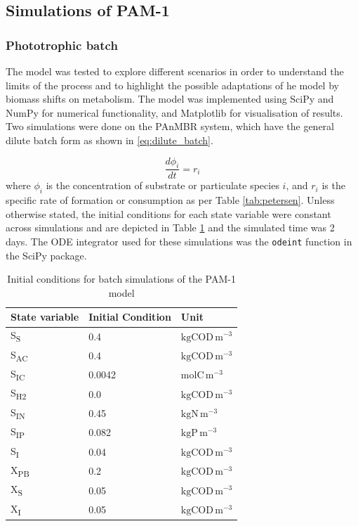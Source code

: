 \subsection{Simulations of PAM-1}

\subsubsection{Phototrophic batch}
The model was tested to explore different scenarios in order to understand the limits of the process and to highlight the possible adaptations of he model by biomass shifts on metabolism. 
The model was implemented using SciPy \cite{jones2001} and NumPy \cite{walt2011} for numerical functionality, and Matplotlib \cite{hunter2007} for visualisation of results. 
Two simulations were done on the PAnMBR system, which have the general dilute batch form as shown in \eqref{eq:dilute_batch}.

\begin{equation}
    \frac{d\phi_i}{dt} = r_i
    \label{eq:dilute_batch}
\end{equation}
where $\phi_i$ is the concentration of substrate or particulate species $i$, and $r_i$ is the specific rate of formation or consumption as per Table \ref{tab:petersen}. Unless otherwise stated, the initial conditions for each state variable were constant across simulations and are depicted in Table \ref{tab:init_conditions_ch2} and the simulated time was 2 days. The ODE integrator used for these simulations was the \texttt{odeint} function in the SciPy package. 

\begin{table}[H]
    \centering
    \small
    \caption{Initial conditions for batch simulations of the PAM-1 model}
    \tabcolsep=0.11cm
    \begin{tabular}{l l l} \toprule
        State variable & Initial Condition & Unit  \\ 
        \hline
        S\textsubscript{S} & 0.4 &  $\mathrm{kgCOD\, m^{-3}}$\\
        S\textsubscript{AC} & 0.4 &  $\mathrm{kgCOD\, m^{-3}}$\\
        S\textsubscript{IC} & \num{0.0042} &  $\mathrm{molC\, m^{-3}}$\\
        S\textsubscript{H2} & 0.0 &  $\mathrm{kgCOD\, m^{-3}}$\\
        S\textsubscript{IN} & 0.45 &  $\mathrm{kgN\, m^{-3}}$\\
        S\textsubscript{IP} & 0.082 &  $\mathrm{kgP\, m^{-3}}$\\
        S\textsubscript{I} & 0.04 &  $\mathrm{kgCOD\, m^{-3}}$\\
        X\textsubscript{PB} & 0.2 &  $\mathrm{kgCOD\, m^{-3}}$\\
        X\textsubscript{S} & 0.05 &  $\mathrm{kgCOD\, m^{-3}}$\\
        X\textsubscript{I} & 0.05 &  $\mathrm{kgCOD\, m^{-3}}$\\
        \bottomrule
    \end{tabular}
    \label{tab:init_conditions_ch2}
\end{table}




